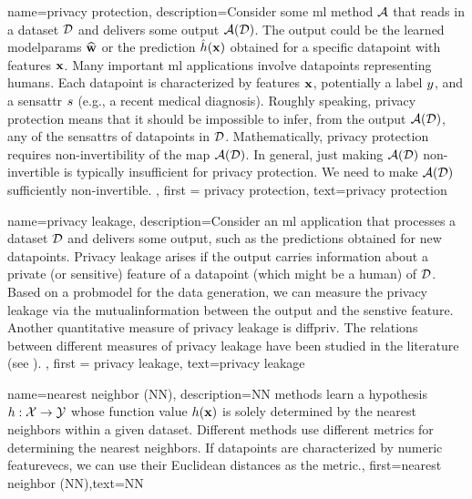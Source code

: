{name={privacy protection},
     description={Consider some \gls{ml} method $\mathcal{A}$ that reads 
	 in a \gls{dataset} $\mathcal{D}$ and delivers some output $\mathcal{A}(\mathcal{D})$. The output 
	 could be the learned \gls{modelparams} $\widehat{{\bf w}}$ or the \gls{prediction} 
	 $\hat{h}({\bf x})$ obtained for a specific \gls{datapoint} with \gls{feature}s 
	 ${\bf x}$. Many important \gls{ml} applications involve \gls{datapoint}s 
		representing humans. Each \gls{datapoint} is characterized by \gls{feature}s ${\bf x}$, 
		potentially a \gls{label} $y$, and a \gls{sensattr} $s$ (e.g., a recent medical diagnosis). 
		Roughly speaking, privacy protection means that it should be impossible to infer, from the output $\mathcal{A}(\mathcal{D})$, 
		any of the \gls{sensattr}s of \gls{datapoint}s in $\mathcal{D}$. Mathematically, privacy protection requires non-invertibility 
		of the map $\mathcal{A}(\mathcal{D})$. In general, just making $\mathcal{A}(\mathcal{D})$ non-invertible 
		is typically insufficient for privacy protection. We need to make $\mathcal{A}(\mathcal{D})$ sufficiently non-invertible. 
	}, 
	first = {privacy protection}, text={privacy protection} 
}

{
	name=privacy leakage,
	description={Consider an \gls{ml} application that processes a 
	\gls{dataset} $\mathcal{D}$ and delivers some output, such as the \gls{prediction}s 
	obtained for new \gls{datapoint}s. Privacy leakage arises 
	if the output carries information about a private (or sensitive) \gls{feature} of 
	a \gls{datapoint} (which might be a human) of $\mathcal{D}$. Based on a \gls{probmodel} 
	for the \gls{data} generation, we can measure the privacy leakage via the \gls{mutualinformation} 
	between the output and the senstive \gls{feature}. Another quantitative measure of privacy leakage 
	is \gls{diffpriv}. The relations between different measures of privacy leakage have been 
	studied in the literature (see \cite{InfThDiffPriv}). 
	}, 
	first = {privacy leakage}, text={privacy leakage} 
}




{
	name={nearest neighbor (NN)},
	description={NN methods learn a \gls{hypothesis} 
		$h: \mathcal{X} \rightarrow \mathcal{Y}$ whose function value $h({\bf x})$ 
		is solely determined by the nearest \gls{neighbors} within a given \gls{dataset}. Different 
		methods use different metrics for determining the nearest \gls{neighbors}. If \gls{datapoint}s 
		are characterized by numeric \gls{featurevec}s, we can use their Euclidean distances as 
		the metric.},
	first={nearest neighbor (NN)},text={NN} 
}

